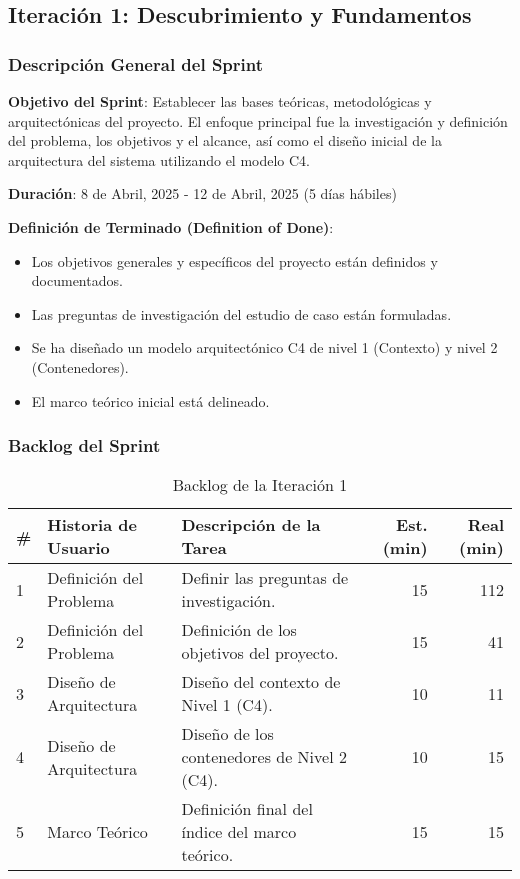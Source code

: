 \subsection{Iteración 1: Descubrimiento y Fundamentos}

\subsubsection{Descripción General del Sprint}

\textbf{Objetivo del Sprint}: Establecer las bases teóricas, metodológicas y arquitectónicas del proyecto. El enfoque principal fue la investigación y definición del problema, los objetivos y el alcance, así como el diseño inicial de la arquitectura del sistema utilizando el modelo C4.

\textbf{Duración}: 8 de Abril, 2025 - 12 de Abril, 2025 (5 días hábiles)

\textbf{Definición de Terminado (Definition of Done)}:
\begin{itemize}
    \item Los objetivos generales y específicos del proyecto están definidos y documentados.
    \item Las preguntas de investigación del estudio de caso están formuladas.
    \item Se ha diseñado un modelo arquitectónico C4 de nivel 1 (Contexto) y nivel 2 (Contenedores).
    \item El marco teórico inicial está delineado.
\end{itemize}

\subsubsection{Backlog del Sprint}

\begin{table}[H]
\caption{Backlog de la Iteración 1}
\label{tab:iteration-1-backlog}
\begin{tabularx}{\textwidth}{@{}llXrr@{}}
\toprule
\textbf{\#} & \textbf{Historia de Usuario} & \textbf{Descripción de la Tarea} & \textbf{Est. (min)} & \textbf{Real (min)} \\
\midrule
    1 & Definición del Problema & Definir las preguntas de investigación. & 15 & 112 \\
    2 & Definición del Problema & Definición de los objetivos del proyecto. & 15 & 41 \\
    3 & Diseño de Arquitectura & Diseño del contexto de Nivel 1 (C4). & 10 & 11 \\
    4 & Diseño de Arquitectura & Diseño de los contenedores de Nivel 2 (C4). & 10 & 15 \\
    5 & Marco Teórico & Definición final del índice del marco teórico. & 15 & 15 \\
\bottomrule
\end{tabularx}
\end{table}

